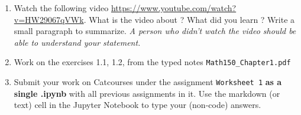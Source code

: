 \documentclass[11pt]{article}
\begin{document}
\begin{enumerate}
\item Watch the following video \url{https://www.youtube.com/watch?v=HW29067qVWk}. What is the video about ? What did you learn ? Write a small paragraph to summarize. \textit{A person who didn't watch the video should be able to understand your statement.}
\item Work on the exercises 1.1, 1.2, from the typed notes \texttt{Math150\_Chapter1.pdf}
\item Submit your work on Catcourses under the assignment \texttt{Worksheet 1} \textbf{as a single .ipynb} with all previous assignments in it. Use the markdown (or text) cell in the Jupyter Notebook to type your (non-code) answers.
\end{enumerate}
\end{document}
